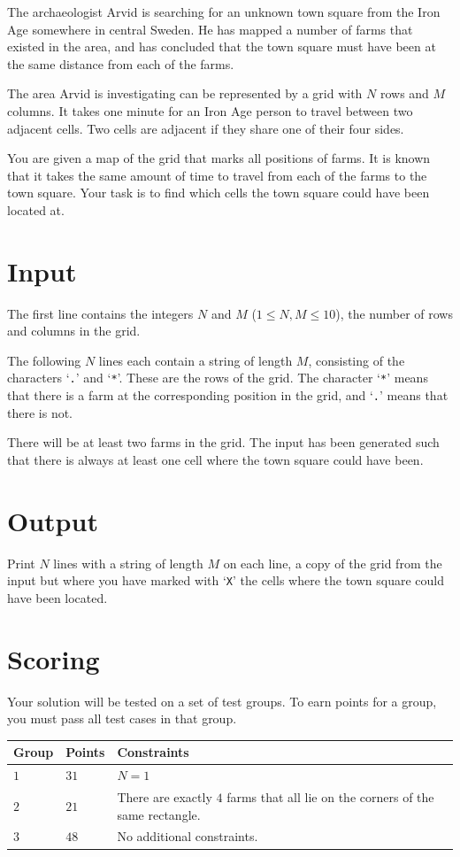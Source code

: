 
The archaeologist Arvid is searching for an unknown town square from the Iron Age somewhere in central Sweden.
He has mapped a number of farms that existed in the area, and has concluded that the town square must have been at the same distance from each of the farms.

The area Arvid is investigating can be represented by a grid with $N$ rows and $M$ columns.
It takes one minute for an Iron Age person to travel between two adjacent cells.
Two cells are adjacent if they share one of their four sides.

You are given a map of the grid that marks all positions of farms.
It is known that it takes the same amount of time to travel from each of the farms to the town square.
Your task is to find which cells the town square could have been located at.

\section*{Input}
The first line contains the integers $N$ and $M$ ($1 \leq N,M \leq 10$), the number of rows and columns in the grid.

The following $N$ lines each contain a string of length $M$, consisting of the characters `\verb|.|' and `\verb|*|'.
These are the rows of the grid.
The character `\verb|*|' means that there is a farm at the corresponding position in the grid, and `\verb|.|' means that there is not.

There will be at least two farms in the grid.
The input has been generated such that there is always at least one cell where the town square could have been.

\section*{Output}
Print $N$ lines with a string of length $M$ on each line, a copy of the grid from the input but where you have marked with `\verb|X|' the cells where the town square could have been located.

\section*{Scoring}
Your solution will be tested on a set of test groups.
To earn points for a group, you must pass all test cases in that group.


\noindent
\begin{tabular}{| l | l | p{12cm} |}
  \hline
  \textbf{Group} & \textbf{Points} & \textbf{Constraints} \\ \hline
  $1$      & $31$      & $N = 1$ \\ \hline
  $2$      & $21$      & There are exactly $4$ farms that all lie on the corners of the same rectangle. \\ \hline
  $3$      & $48$      & No additional constraints. \\ \hline
\end{tabular}


